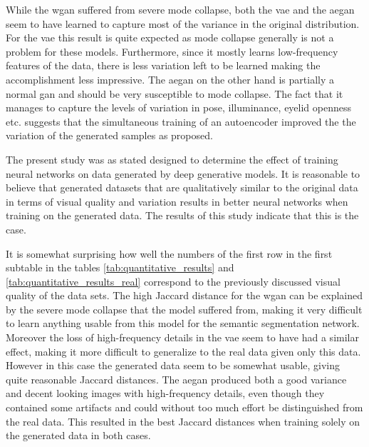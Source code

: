 While the \acrshort{wgan} suffered from severe mode collapse, both the \acrshort{vae} and the \acrshort{aegan} seem to have learned to capture most of the variance in the original distribution. For the \acrshort{vae} this result is quite expected as mode collapse generally is not a problem for these models. Furthermore, since it mostly learns low-frequency features of the data, there is less variation left to be learned making the accomplishment less impressive. The \acrshort{aegan} on the other hand is partially a normal \acrshort{gan} and should be very susceptible to mode collapse. The fact that it manages to capture the levels of variation in pose, illuminance, eyelid openness etc. suggests that the simultaneous training of an autoencoder improved the the variation of the generated samples as proposed.





The present study was as stated designed to determine the effect of training neural networks on data generated by deep generative models. It is reasonable to believe that generated datasets that are qualitatively similar to the original data in terms of visual quality and variation results in better neural networks when training on the generated data. The results of this study indicate that this is the case. 

It is somewhat surprising how well the numbers of the first row in the first subtable in the tables \ref{tab:quantitative_results} and \ref{tab:quantitative_results_real} correspond to the previously discussed visual quality of the data sets. 
The high Jaccard distance for the \acrshort{wgan} can be explained by the severe mode collapse that the model suffered from, making it very difficult to learn anything usable from this model for the semantic segmentation network. Moreover the loss of high-frequency details in the \acrshort{vae} seem to have had a similar effect, making it more difficult to generalize to the real data given only this data. However in this case the generated data seem to be somewhat usable, giving quite reasonable Jaccard distances. The \acrshort{aegan} produced both a good variance and decent looking images with high-frequency details, even though they contained some artifacts and could without too much effort be distinguished from the real data. This resulted in the best Jaccard distances when training solely on the generated data in both cases.


